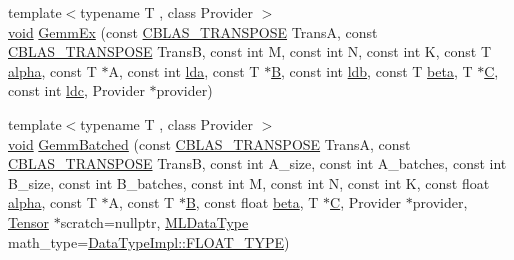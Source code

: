 \begin{DoxyCompactItemize}
\item 
{\footnotesize template$<$typename T , class Provider $>$ }\\\mbox{\hyperlink{mlasi_8h_a88f941d423cb2a819b70a1358982b1a6}{void}} \mbox{\hyperlink{namespaceonnxruntime_1_1math_a9c33fbd7bdc74a3620921afbc8135451}{Gemm\+Ex}} (const \mbox{\hyperlink{cblas_8h_a44dfaddb823648755b110dbad849c5a9}{C\+B\+L\+A\+S\+\_\+\+T\+R\+A\+N\+S\+P\+O\+SE}} TransA, const \mbox{\hyperlink{cblas_8h_a44dfaddb823648755b110dbad849c5a9}{C\+B\+L\+A\+S\+\_\+\+T\+R\+A\+N\+S\+P\+O\+SE}} TransB, const int M, const int N, const int K, const T \mbox{\hyperlink{mlasi_8h_a1763355f32e1812e5cb3a0080e7cca12}{alpha}}, const T $\ast$A, const int \mbox{\hyperlink{mlasi_8h_a38dd84f17dbd65aaf9f618e5c3ec496f}{lda}}, const T $\ast$\mbox{\hyperlink{mlasi_8h_a472f4360dfbf830e5135980ff43484b9}{B}}, const int \mbox{\hyperlink{mlasi_8h_a4431ce68ee01016a66896cedd34a57db}{ldb}}, const T \mbox{\hyperlink{mlasi_8h_a5fd37d216981b4cd9a19e29b5acd48d4}{beta}}, T $\ast$\mbox{\hyperlink{mlasi_8h_a5693f8b3559ce97985de5239fdcf6006}{C}}, const int \mbox{\hyperlink{mlasi_8h_ab55e28f894e92d01896d7dfc5e3cfa86}{ldc}}, Provider $\ast$provider)
\item 
{\footnotesize template$<$typename T , class Provider $>$ }\\\mbox{\hyperlink{mlasi_8h_a88f941d423cb2a819b70a1358982b1a6}{void}} \mbox{\hyperlink{namespaceonnxruntime_1_1math_ae3525472d980958f066d644d49660a5f}{Gemm\+Batched}} (const \mbox{\hyperlink{cblas_8h_a44dfaddb823648755b110dbad849c5a9}{C\+B\+L\+A\+S\+\_\+\+T\+R\+A\+N\+S\+P\+O\+SE}} TransA, const \mbox{\hyperlink{cblas_8h_a44dfaddb823648755b110dbad849c5a9}{C\+B\+L\+A\+S\+\_\+\+T\+R\+A\+N\+S\+P\+O\+SE}} TransB, const int A\+\_\+size, const int A\+\_\+batches, const int B\+\_\+size, const int B\+\_\+batches, const int M, const int N, const int K, const float \mbox{\hyperlink{mlasi_8h_a1763355f32e1812e5cb3a0080e7cca12}{alpha}}, const T $\ast$A, const T $\ast$\mbox{\hyperlink{mlasi_8h_a472f4360dfbf830e5135980ff43484b9}{B}}, const float \mbox{\hyperlink{mlasi_8h_a5fd37d216981b4cd9a19e29b5acd48d4}{beta}}, T $\ast$\mbox{\hyperlink{mlasi_8h_a5693f8b3559ce97985de5239fdcf6006}{C}}, Provider $\ast$provider, \mbox{\hyperlink{classonnxruntime_1_1Tensor}{Tensor}} $\ast$scratch=nullptr, \mbox{\hyperlink{namespaceonnxruntime_ad77d0a6e838ec7da5dc35fed5ee66b49}{M\+L\+Data\+Type}} math\+\_\+type=\mbox{\hyperlink{math_8h_a41cf4177f569cb6b87ec5c90c0165769}{Data\+Type\+Impl\+::\+F\+L\+O\+A\+T\+\_\+\+T\+Y\+PE}})
\item 

\end{DoxyCompactItemize}
